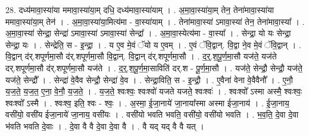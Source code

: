 \documentclass[17pt]{extarticle}
\begin{document}
28. दध्य॑मावा॒स्या॑या ममावा॒स्या॑या॒म् दधि॒ दध्य॑मावा॒स्या॑याम् । . अ॒मा॒वा॒स्या॑या॒म् तेन॒ तेना॑मावा॒स्या॑या ममावा॒स्या॑या॒म् तेन॑ । . अ॒मा॒वा॒स्या॑या॒मित्य॑मा - वा॒स्या॑याम् । . तेना॑मावा॒स्या॑ ऽमावा॒स्या॑ तेन॒ तेना॑मावा॒स्या᳚ । . अ॒मा॒वा॒स्या॑ सेन्द्रा॒ सेन्द्रा॑ ऽमावा॒स्या॑ ऽमावा॒स्या॑ सेन्द्रा᳚ । . अ॒मा॒वा॒स्येत्य॑मा - वा॒स्या᳚ । . सेन्द्रा॒ यो यः सेन्द्रा॒ सेन्द्रा॒ यः । . सेन्द्रेति॒ स - इ॒न्द्रा॒ । . य ए॒व मे॒वं ॅयो य ए॒वम् । . ए॒वं ॅवि॒द्वान्. वि॒द्वा ने॒व मे॒वं ॅवि॒द्वान् । . वि॒द्वान् द॑र्.शपूर्णमा॒सौ द॑र्.शपूर्णमा॒सौ वि॒द्वान्. वि॒द्वान् द॑र्.शपूर्णमा॒सौ । . द॒र्॒.श॒पू॒र्ण॒मा॒सौ यज॑ते॒ यज॑ते दर्.शपूर्णमा॒सौ द॑र्.शपूर्णमा॒सौ यज॑ते । . द॒र्॒.श॒पू॒र्ण॒मा॒साविति॑ दर्.श - पू॒र्ण॒मा॒सौ । . यज॑ते॒ सेन्द्रौ॒ सेन्द्रौ॒ यज॑ते॒ यज॑ते॒ सेन्द्रौ᳚ । . सेन्द्रा॑ वे॒वैव सेन्द्रौ॒ सेन्द्रा॑ वे॒व । . सेन्द्रा॒विति॒ स - इ॒न्द्रौ॒ । . ए॒वैना॑ वेना वे॒वैवैनौ᳚ । . ए॒नौ॒ य॒ज॒ते॒ य॒ज॒त॒ ए॒ना॒ वे॒नौ॒ य॒ज॒ते॒ । . य॒ज॒ते॒ श्वःश्वः॒ श्वःश्वो॑ यजते यजते॒ श्वःश्वः॑ । . श्वःश्वो᳚ ऽस्मा अस्मै॒ श्वःश्वः॒ श्वःश्वो᳚ ऽस्मै । . श्वःश्व॒ इति॒ श्वः - श्वः॒ । . अ॒स्मा॒ ई॒जा॒नाये॑ जा॒नाया᳚स्मा अस्मा ईजा॒नाय॑ । . ई॒जा॒नाय॒ वसी॑यो॒ वसी॑य ईजा॒नाये॑ जा॒नाय॒ वसी॑यः । . वसी॑यो भवति भवति॒ वसी॑यो॒ वसी॑यो भवति । . भ॒व॒ति॒ दे॒वा दे॒वा भ॑वति भवति दे॒वाः । . दे॒वा वै वै दे॒वा दे॒वा वै । . वै यद् यद् वै वै यत् । \newline
\end{document}

